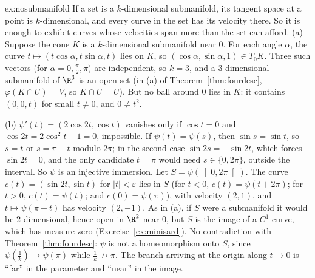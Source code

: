 \begin{solution}{ex:nosubmanifold}
\idea If a set is a $k$-dimensional submanifold, its tangent space at a point is $k$-dimensional, and every curve in the set has its velocity there.
So it is enough to exhibit curves whose velocities span more than the set can afford.
\writeup (a) Suppose the cone $K$ is a $k$-dimensional submanifold near $0$. For each angle $\alpha$, the curve $t\mapsto(t\cos\alpha,t\sin\alpha,t)$ lies on $K$, so
$(\cos\alpha,\sin\alpha,1)\in T_0K$. Three such vectors (for $\alpha=0,\frac\pi2,\pi$) are independent, so $k=3$, and a $3$-dimensional submanifold of $\R^3$ is
an open set (in (a) of Theorem~\ref{thm:fourdesc}, $\varphi(K\cap U)=V$, so $K\cap U=U$). But no ball around $0$ lies in $K$: it contains $(0,0,t)$ for small
$t\ne0$, and $0\ne t^2$.

(b) $\psi'(t)=(2\cos2t,\cos t)$ vanishes only if $\cos t=0$ and $\cos2t=2\cos^2t-1=0$, impossible. If $\psi(t)=\psi(s)$, then $\sin s=\sin t$, so $s=t$ or
$s=\pi-t$ modulo $2\pi$; in the second case $\sin2s=-\sin2t$, which forces $\sin2t=0$, and the only candidate $t=\pi$ would need $s\in\{0,2\pi\}$, outside the
interval. So $\psi$ is an injective immersion. Let $S=\psi(\left]0,2\pi\right[)$. The curve $c(t)=(\sin2t,\sin t)$ for $|t|<\varepsilon$ lies in $S$ (for
$t<0$, $c(t)=\psi(t+2\pi)$; for $t>0$, $c(t)=\psi(t)$; and $c(0)=\psi(\pi)$), with velocity $(2,1)$, and $t\mapsto\psi(\pi+t)$ has velocity $(2,-1)$.
As in (a), if $S$ were a submanifold it would be $2$-dimensional, hence open in $\R^2$ near $0$, but $S$ is the image of a $C^1$ curve, which has measure
zero (Exercise~\ref{ex:minisard}). No contradiction with Theorem~\ref{thm:fourdesc}: $\psi$ is not a homeomorphism onto $S$, since
$\psi(\frac1k)\to\psi(\pi)$ while $\frac1k\not\to\pi$. The branch arriving at the origin along $t\to0$ is ``far'' in the parameter and ``near'' in the image.
\end{solution}

